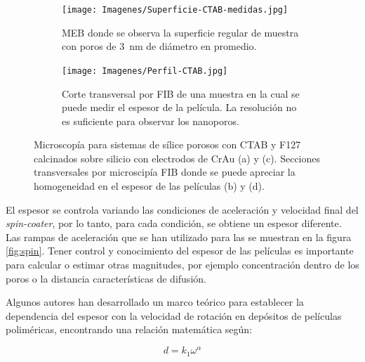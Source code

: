 \begin{figure}[bh!]
\begin{subfigure}[t]{0.495\textwidth}
			       		\label{fig:sem_homogeneidad2}
			       		\end{subfigure}	
			       	\begin{subfigure}[t]{0.495\textwidth}
			        	\texttt{[image: Imagenes/Superficie-CTAB-medidas.jpg]}
			       		\caption{MEB donde se observa la superficie regular de muestra \pdmC\space con poros de \SI{3}{nm} de diámetro en promedio.}
			       		\label{fig:sem_homogeneidad3}
			       		\end{subfigure}
					\begin{subfigure}[t]{0.49\textwidth}
			 	   	    \texttt{[image: Imagenes/Perfil-CTAB.jpg]}
			       		\caption{Corte transversal por FIB de una muestra \pdmC\space en la cual se puede medir el espesor de la película. La resolución no es suficiente para observar los nanoporos.}
			       		\label{fig:sem_homogeneidad4}
			       		\end{subfigure}	
					
					\vspace{-2mm}
					 \caption[MEB \pdmC\space y \pdmF.]{Microscopía para sistemas de sílice porosos con CTAB y F127 calcinados sobre silicio con electrodos de Cr\textbar Au (a) y (c). Secciones transversales por microscipía FIB donde se puede apreciar la homogeneidad en el espesor de las películas (b) y (d).}
					 \label{fig:sem_homogeneidad}	
				     \vspace*{0.2cm}
				     \end{figure}
 	
		 El espesor se controla variando las condiciones de aceleración y velocidad final del \textit{spin-coater}, por lo tanto, para cada condición, se obtiene un espesor diferente. Las rampas de aceleración que se han utilizado para las \pdm\space se muestran en la figura \ref{fig:spin}. Tener control y conocimiento del espesor de las películas es importante para calcular o estimar otras magnitudes, por ejemplo concentración dentro de los poros o la distancia características de difusión. 

		 Algunos autores han desarrollado un marco teórico para establecer la dependencia del espesor con la velocidad de rotación en depósitos de películas poliméricas, encontrando una relación matemática según: \cite{Norrman2005,Meyerhofer1978,Bornside1989,Lora1990}
	
			\begin{equation}
			  d = k_1 \omega^{\alpha}
			  \label{eq:spin_meso}
			  \end{equation}		
	
